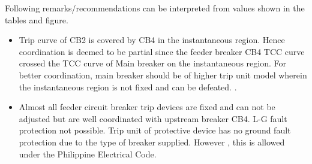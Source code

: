 Following remarks/recommendations can be interpreted from values shown in the tables and figure.

\begin{itemize}
\item Trip curve of CB2 is covered by CB4 in the instantaneous region. Hence coordination is deemed to be partial since the feeder breaker CB4 TCC curve crossed the TCC curve of Main breaker on the instantaneous region. For better coordination, main breaker should be of higher trip unit model wherein the instantaneous region is not fixed and can be defeated. .

\item Almost all feeder circuit breaker trip devices are fixed and can not be adjusted but are well coordinated with upstream breaker CB4. L-G fault protection not possible. Trip unit of protective device has no ground fault protection due to the type of breaker supplied. However , this is allowed under the Philippine Electrical Code.

\end{itemize}


